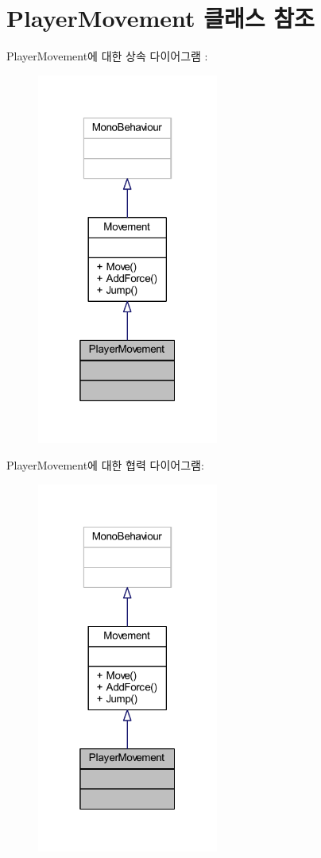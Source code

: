 \hypertarget{class_player_movement}{}\section{Player\+Movement 클래스 참조}
\label{class_player_movement}


Player\+Movement에 대한 상속 다이어그램 \+: 
\nopagebreak
\begin{figure}[H]
\begin{center}
\leavevmode
\includegraphics[width=169pt]{de/d46/class_player_movement__inherit__graph}
\end{center}
\end{figure}


Player\+Movement에 대한 협력 다이어그램\+:
\nopagebreak
\begin{figure}[H]
\begin{center}
\leavevmode
\includegraphics[width=169pt]{d5/df4/class_player_movement__coll__graph}
\end{center}
\end{figure}
